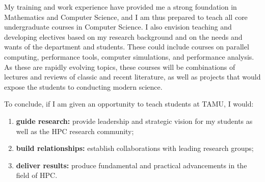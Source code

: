 \documentclass[11pt]{article}
\begin{document}
My training and work experience have provided me a strong foundation in Mathematics and Computer Science, and I am thus prepared to teach all core undergraduate
courses in Computer Science.  I also envision teaching and developing electives based on my research background and on the needs and wants of the department and students.
These could include courses on parallel computing, performance tools, computer simulations, and performance analysis.
As these are rapidly evolving topics, these courses will be combinations of lectures and reviews of classic and recent literature,
as well as projects that would expose the students to conducting modern science.


To conclude, if I am given an opportunity to teach students at TAMU, I would:

\begin{enumerate}
\item {\bf guide research:} provide leadership and strategic vision for my students as well as the HPC research community;
\item {\bf build relationships:} establish collaborations with leading research groups;
\item {\bf deliver results:} produce fundamental and practical advancements in the field of HPC.
\end{enumerate}
\end{document}
